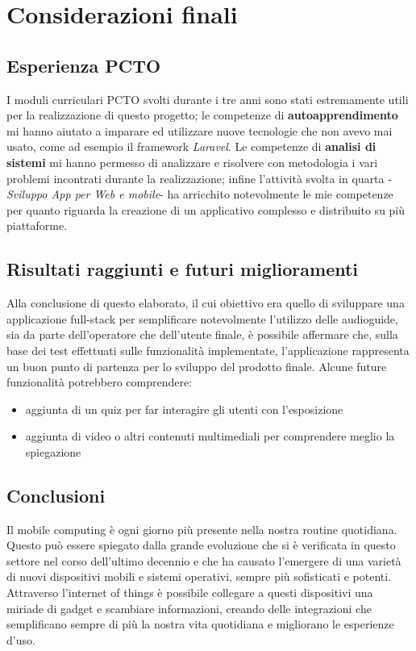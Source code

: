 \documentclass[12pt]{article}
\begin{document}
\section{Considerazioni finali}
\subsection{Esperienza PCTO}
I moduli curriculari PCTO svolti durante i tre anni sono stati estremamente utili per la realizzazione di questo progetto; le competenze di \textbf{autoapprendimento} mi hanno aiutato a imparare ed utilizzare nuove tecnologie che non avevo mai usato, come ad esempio il framework \emph{Laravel}. Le competenze di \textbf{analisi di sistemi} mi hanno permesso di analizzare e risolvere con metodologia i vari problemi incontrati durante la realizzazione; infine l'attività svolta in quarta -\emph{Sviluppo App per Web e mobile}- ha arricchito notevolmente le mie competenze per quanto riguarda la creazione di un applicativo complesso e distribuito su più piattaforme.

\subsection{Risultati raggiunti e futuri miglioramenti}
Alla conclusione di questo elaborato, il cui obiettivo era quello di sviluppare una applicazione full-stack per semplificare notevolmente l'utilizzo delle audioguide, sia da parte dell'operatore che dell'utente finale, è possibile affermare che, sulla base dei test effettuati sulle funzionalità implementate, l'applicazione rappresenta un buon punto di partenza per lo sviluppo del prodotto finale. Alcune future funzionalità potrebbero comprendere:
\begin{itemize}
    \item aggiunta di un quiz per far interagire gli utenti con l'esposizione
    \item aggiunta di video o altri contenuti multimediali per comprendere meglio la spiegazione
\end{itemize} 


\subsection{Conclusioni}


Il mobile computing è ogni giorno più presente nella nostra routine quotidiana. Questo può essere spiegato dalla grande evoluzione che si è verificata in questo settore nel corso dell'ultimo decennio e che ha causato l'emergere di una varietà di nuovi dispositivi mobili e sistemi operativi, sempre più sofisticati e potenti.  Attraverso l'internet of things è possibile collegare a questi dispositivi una miriade di gadget e scambiare informazioni, creando delle integrazioni che semplificano sempre di più la nostra vita quotidiana e migliorano le esperienze d'uso.

\printbibliography
\end{document}

